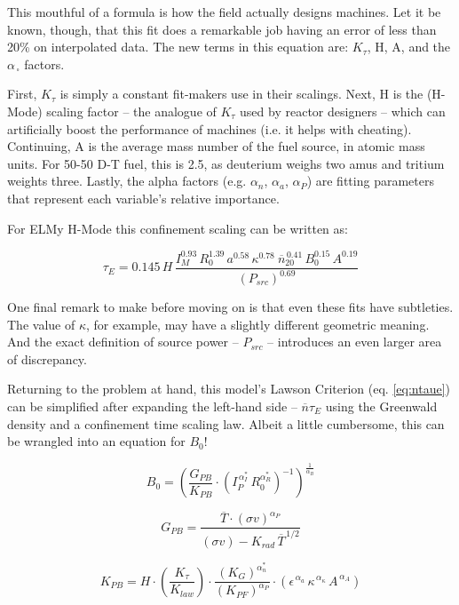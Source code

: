 \documentclass[11pt]{book}
\begin{document}
This mouthful of a formula is how the field actually designs machines. Let it be known, though, that this fit does a remarkable job having an error of less than 20\% on interpolated data. The new terms in this equation are: $K_\tau$, H, A, and the $\alpha_{\,\square}$ factors. 

First, $K_\tau$ is simply a constant fit-makers use in their scalings. Next, H is the (H-Mode) scaling factor -- the analogue of $K_\tau$ used by reactor designers -- which can artificially boost the performance of machines (i.e. it helps with cheating). Continuing, A is the average mass number of the fuel source, in atomic mass units. For 50-50 D-T fuel, this is 2.5, as deuterium weighs two amus and tritium weights three. Lastly, the alpha factors (e.g. $\alpha_n$, $\alpha_a$, $\alpha_P$) are fitting parameters that represent each variable's relative importance. 

For ELMy H-Mode this confinement scaling can be written as:

\begin{equation}
	\tau_E = 0.145 \, H \, \frac{
		I_M^{0.93} \, R_0^{1.39} \, a^{0.58} \, \kappa^{0.78} \ \overline{n}_{20}^{\, 0.41} \, B_0^{0.15} \, A^{0.19}
	}{ ( P_{src} ) ^ {0.69} }
\end{equation}

One final remark to make before moving on is that even these fits have subtleties. The value of $\kappa$, for example, may have a slightly different geometric meaning. And the exact definition of source power -- $P_{src}$ -- introduces an even larger area of discrepancy. 

Returning to the problem at hand, this model's Lawson Criterion (eq. \ref{eq:ntaue}) can be simplified after expanding the left-hand side -- $\overline n \tau_E $ using the Greenwald density and a confinement time scaling law. Albeit a little cumbersome, this can be wrangled into an equation for $B_0$!

\begin{equation}
	B_0 = \left( \frac{ G_{PB} }{ K_{PB} } \cdot \left( I_P^{\,\alpha_I^*} \, R_0^{ \alpha_R^* } \right)^{-1} \right) ^ { \frac{1}{ \alpha_B } }
\end{equation}

\begin{equation}
	G_{PB} = \frac{ \overline{T} \cdot  (\sigma v) ^ {\alpha_P} } { (\sigma v) - K_{rad} \, \overline{T}^{  \,1/2 } }
\end{equation}

\begin{equation}
	K_{PB} = H \cdot \left( \frac{ K_\tau  }{ K_{law} } \right) \cdot \frac{ \left( K_{G} \right)^{\alpha_n^*} }{ ( K_{PF} ) ^ {\alpha_P} } \cdot \left( 
     \epsilon^{\,\alpha_a} \, \kappa^{\,\alpha_\kappa} \, A^{\,\alpha_A}\right)
\end{equation}
\end{document}
